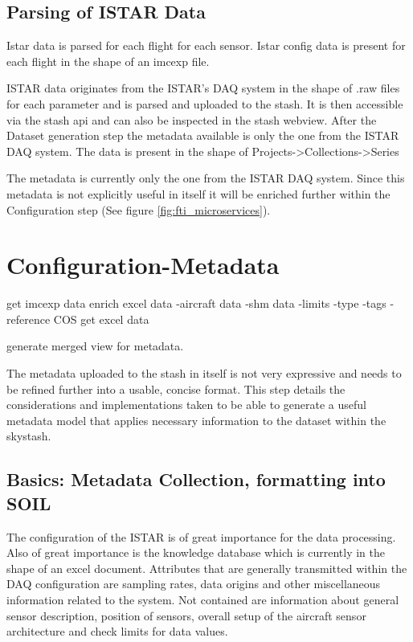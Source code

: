 \subsection{ Parsing of ISTAR Data}

Istar data is parsed for each flight for each sensor. Istar config data is present for each flight in the shape of an imcexp file.

ISTAR data originates from the ISTAR's DAQ system in the shape of .raw files for each parameter and is parsed and uploaded to the stash. It is then accessible via the stash api and can also be inspected in the stash webview. After the Dataset generation step the metadata available is only the one from the ISTAR DAQ system.
The data is present in the shape of Projects->Collections->Series

The metadata is currently only the one from the ISTAR DAQ system. Since this metadata is not explicitly useful in itself it will be enriched further within the Configuration step (See figure \ref{fig:fti_microservices}).


\section{Configuration-Metadata}

get imcexp data
enrich excel data
-aircraft data
-shm data
-limits
-type
-tags
-reference COS
get excel data


generate merged view for metadata.


The metadata uploaded to the stash in itself is not very expressive and needs to be refined further into a usable, concise format. This step details the considerations and implementations taken to be able to generate a useful metadata model that applies necessary information to the dataset within the skystash.

\subsection{ Basics: Metadata Collection, formatting into SOIL}
The configuration of the ISTAR is of great importance for the data processing. Also of great importance is the knowledge database which is currently in the shape of an excel document.
Attributes that are generally transmitted within the DAQ configuration are sampling rates, data origins and other miscellaneous information related to the system. Not contained are information about general sensor description, position of sensors, overall setup of the aircraft sensor architecture and check limits for data values.

